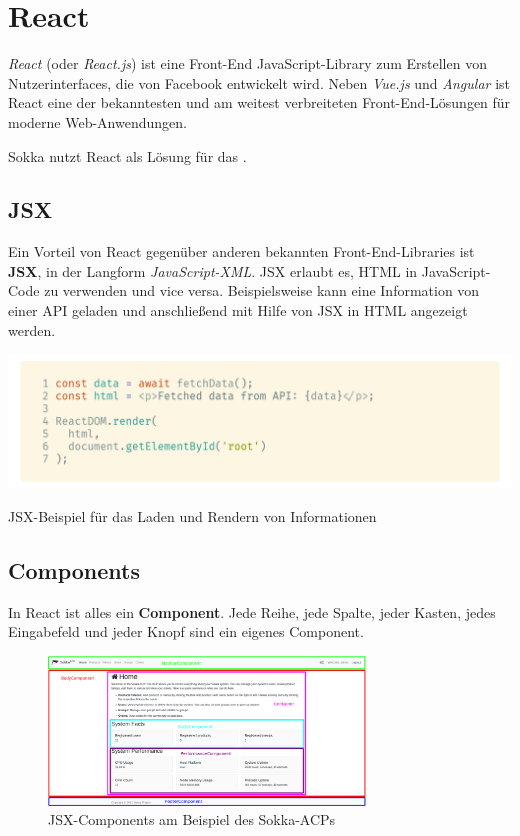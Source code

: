 \section{React}

\textit{React} (oder \textit{React.js}) ist eine Front-End JavaScript-Library zum Erstellen von Nutzerinterfaces, die von Facebook entwickelt wird. Neben \textit{Vue.js} und \textit{Angular} ist React eine der bekanntesten und am weitest verbreiteten Front-End-Lösungen für moderne Web-Anwendungen. \cite{nadafkhanrathod2020}

Sokka nutzt React als Lösung für das .

\subsection{JSX}

Ein Vorteil von React gegenüber anderen bekannten Front-End-Libraries ist \textbf{JSX}, in der Langform \textit{JavaScript-XML}. JSX erlaubt es, HTML in JavaScript-Code zu verwenden und vice versa. Beispielsweise kann eine Information von einer API geladen und anschließend mit Hilfe von JSX in HTML angezeigt werden.

\begin{code}[h]
    \centering
    \includegraphics[width=1\textwidth]{images/React/jsx.png}
    \vspace{-25pt}
    \caption{JSX-Beispiel für das Laden und Rendern von Informationen}
\end{code}

\subsection{Components}

In React ist alles ein \textbf{Component}. Jede Reihe, jede Spalte, jeder Kasten, jedes Eingabefeld und jeder Knopf sind ein eigenes Component.

\begin{figure}[h]
    \begin{center}
        \includegraphics[width=0.75\textwidth]{images/React/components.png}
        \caption{JSX-Components am Beispiel des Sokka-ACPs}
    \end{center}
\end{figure}

